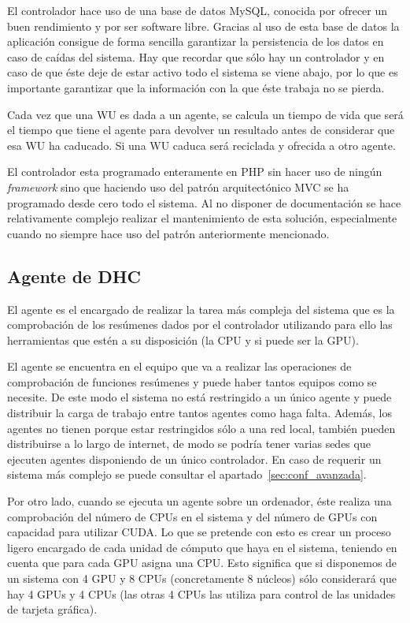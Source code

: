 El controlador hace uso de una base de datos MySQL, conocida por ofrecer un buen rendimiento y por ser software libre. Gracias al uso de esta base de datos la aplicación consigue de forma sencilla garantizar la persistencia de los datos en caso de caídas del sistema. Hay que recordar que sólo hay un controlador y en caso de que éste deje de estar activo todo el sistema se viene abajo, por lo que es importante garantizar que la información con la que éste trabaja no se pierda.

Cada vez que una WU es dada a un agente, se calcula un tiempo de vida que será el tiempo que tiene el agente para devolver un resultado antes de considerar que esa WU ha caducado. Si una WU caduca será reciclada y ofrecida a otro agente.

El controlador esta programado enteramente en PHP sin hacer uso de ningún \emph{framework} sino que haciendo uso del patrón arquitectónico MVC se ha programado desde cero todo el sistema. Al no disponer de documentación se hace relativamente complejo realizar el mantenimiento de esta solución, especialmente cuando no siempre hace uso del patrón anteriormente mencionado.

\subsection{Agente de DHC}

El agente es el encargado de realizar la tarea más compleja del sistema que es la comprobación de los resúmenes dados por el controlador utilizando para ello las herramientas que estén a su disposición (la CPU y si puede ser la GPU).

El agente se encuentra en el equipo que va a realizar las operaciones de comprobación de funciones resúmenes y puede haber tantos equipos como se necesite. De este modo el sistema no está restringido a un único agente y puede distribuir la carga de trabajo entre tantos agentes como haga falta. Además, los agentes no tienen porque estar restringidos sólo a una red local, también pueden distribuirse a lo largo de internet, de modo se podría tener varias sedes que ejecuten agentes disponiendo de un único controlador. En caso de requerir un sistema más complejo se puede consultar el apartado~\ref{sec:conf_avanzada}.

Por otro lado, cuando se ejecuta un agente sobre un ordenador, éste realiza una comprobación del número de CPUs en el sistema y del número de GPUs con capacidad para utilizar CUDA. Lo que se pretende con esto es crear un proceso ligero encargado de cada unidad de cómputo que haya en el sistema, teniendo en cuenta que para cada GPU asigna una CPU. Esto significa que si disponemos de un sistema con 4 GPU y 8 CPUs (concretamente 8 núcleos) sólo considerará que hay 4 GPUs y 4 CPUs (las otras 4 CPUs las utiliza para control de las unidades de tarjeta gráfica).

